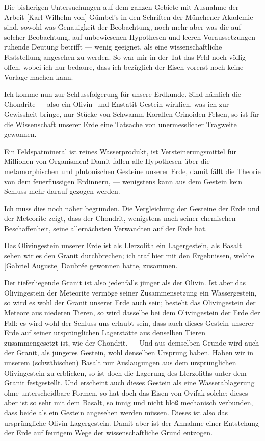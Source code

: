 \documentclass[a4paper, 12pt, oneside]{article}
\begin{document}
Die bisherigen Untersuchungen auf dem ganzen Gebiete mit Ausnahme der Arbeit [Karl Wilhelm von] Gümbel's in den Schriften der Münchener Akademie sind, sowohl was Genauigkeit der Beobachtung, noch mehr aber was die auf solcher Beobachtung, auf unbewiesenen Hypothesen und leeren Voraussetzungen ruhende Deutung betrifft — wenig geeignet, als eine wissenschaftliche Feststellung angesehen zu werden. So war mir in der Tat das Feld noch völlig offen, wobei ich nur bedaure, dass ich bezüglich der Eisen vorerst noch keine Vorlage machen kann.

Ich komme nun zur Schlussfolgerung für unsere Erdkunde. Sind nämlich die Chondrite — also ein Olivin- und Enstatit-Gestein wirklich, was ich zur Gewissheit bringe, nur Stücke von Schwamm-Korallen-Crinoiden-Felsen, so ist für die Wissenschaft unserer Erde eine Tatsache von unermesslicher Tragweite gewonnen.

Ein Feldspatmineral ist reines Wasserprodukt, ist Versteinerungsmittel für Millionen von Organismen! Damit fallen alle Hypothesen über die metamorphischen und plutonischen Gesteine unserer Erde, damit fällt die Theorie von dem feuerflüssigen Erdinnern, — wenigstens kann aus dem Gestein kein Schluss mehr darauf gezogen werden.

Ich muss dies noch näher begründen. Die Vergleichung der Gesteine der Erde und der Meteorite zeigt, dass der Chondrit, wenigstens nach seiner chemischen Beschaffenheit, seine allernächsten Verwandten auf der Erde hat.

Das Olivingestein unserer Erde ist als Llerzolith ein Lagergestein, als Basalt sehen wir es den Granit durchbrechen; ich traf hier mit den Ergebnissen, welche [Gabriel Auguste] Daubrée gewonnen hatte, zusammen.

Der tieferliegende Granit ist also jedenfalls jünger als der Olivin. Ist aber das Olivingestein der Meteorite vermöge seiner Zusammensetzung ein Wassergestein, so wird es wohl der Granit unserer Erde auch sein; besteht das Olivingestein der Meteore aus niederen Tieren, so wird dasselbe bei dem Olivingestein der Erde der Fall: es wird wohl der Schluss uns erlaubt sein, dass auch dieses Gestein unserer Erde auf seiner ursprünglichen Lagerstätte aus denselben Tieren zusammengesetzt ist, wie der Chondrit. — Und aus demselben Grunde wird auch der Granit, als jüngeres Gestein, wohl denselben Ursprung haben. Haben wir in unserem (schwäbischen) Basalt nur Auslaugungen aus dem ursprünglichen Olivingestein zu erblicken, so ist doch die Lagerung des Llerzoliths unter dem Granit festgestellt. Und erscheint auch dieses Gestein als eine Wasserablagerung ohne unterscheidbare Formen, so hat doch das Eisen von Ovifak solche; dieses aber ist so sehr mit dem Basalt, so innig und nicht bloß mechanisch verbunden, dass beide als ein Gestein angesehen werden müssen. Dieses ist also das ursprüngliche Olivin-Lagergestein. Damit aber ist der Annahme einer Entstehung der Erde auf feurigem Wege der wissenschaftliche Grund entzogen.
\end{document}
